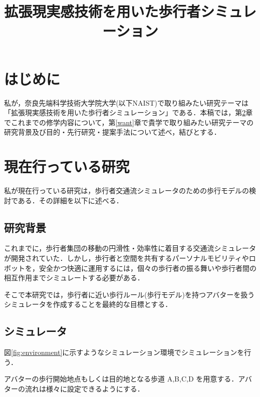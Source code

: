 \documentclass[twocolumn]{jarticle}%
\title{\vspace{5mm}\large{拡張現実感技術を用いた歩行者シミュレーション}\vspace{-15mm}}
\date{}
\begin{document}
\normalsize
\maketitle

\section{はじめに}
\thispagestyle{fancy}

私が，奈良先端科学技術大学院大学(以下NAIST)で取り組みたい研究テーマは「拡張現実感技術を用いた歩行者シミュレーション」である．本稿では，第\ref{current}章でこれまでの修学内容について，第\ref{want}章で貴学で取り組みたい研究テーマの研究背景及び目的・先行研究・提案手法について述べ，結びとする．

\section{現在行っている研究}\label{current}
私が現在行っている研究は，歩行者交通流シミュレータのための歩行モデルの検討である．その詳細を以下に述べる．

\subsection{研究背景}
これまでに，歩行者集団の移動の円滑性・効率性に着目する交通流シミュレータが開発されていた．しかし，歩行者と空間を共有するパーソナルモビリティやロボットを，安全かつ快適に運用するには，個々の歩行者の振る舞いや歩行者間の相互作用までシミュレートする必要がある．

そこで本研究では，歩行者に近い歩行ルール(歩行モデル)を持つアバターを扱うシミュレータを作成することを最終的な目標とする．


\subsection{シミュレータ}
図\ref{fig:environment}に示すようなシミュレーション環境でシミュレーションを行う．

アバターの歩行開始地点もしくは目的地となる歩道 A,B,C,D を用意する．アバターの流れは様々に設定できるようにする．
\end{document}
